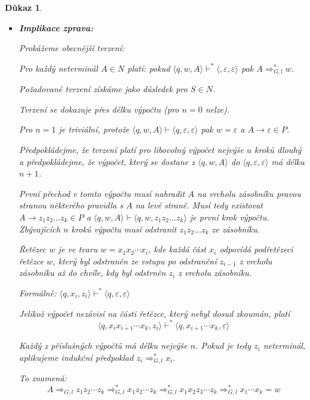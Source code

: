\documentclass[10pt, a4paper, titlepage]{article}
\theoremstyle{note}
\newtheorem{dukaz}{Důkaz}
\begin{document}
\begin{dukaz}
\begin{itemize}
Zřejmě $w=y_{i+1}u_{i+1}$ kde $x_{i+1}=y_iw_iv_i=y_{i+1}z_{i+1}$.

Ve speciálním případě: $i=n$ dostáváme $\langle q,w,S \rangle \vdash^* \langle q,u_n,z_n \rangle$, kde $w=y_nu_n$, $X_n=y_nz_n=w$ tj. dle 1. vlastnosti, protože $z_n$ je celý z terminálnch symbolů, platí, že $z_n=\varepsilon$, to jest $x_n=y_nz_n=y_n=w$ ale $w=y_nu_n$, odtud $u_n=\varepsilon$.

Takže $\langle q,w,S \rangle \vdash^* \langle q,\varepsilon,\varepsilon \rangle$.

\item
\textbf{Implikace zprava:}

Prokážeme obecnější tvrzení:

Pro každý neterminál $A \in N$ platí: pokud $\langle q,w,A \rangle \vdash^* \langle,\varepsilon,\varepsilon \rangle$ pak $A \Rightarrow_{G,l}^* w$.

Požadované tvrzení získáme jako důsledek pro $S \in N$.

Tvrzení se dokazuje přes délku výpočtu (pro $n=0$ nelze).

Pro $n=1$ je triviální, protože $\langle q,w,A \rangle \vdash \langle q,\varepsilon,\varepsilon \rangle$ pak $w=\varepsilon$ a $A \rightarrow \varepsilon \in P$.

Předpokládejme, že tvrzení platí pro libovolný výpočet nejvýše $u$ kroků dlouhý a předpokládejme, že výpočet, který se dostane z $\langle q,w,A \rangle$ do $\langle q,\varepsilon,\varepsilon \rangle$ má délku $n+1$.

První přechod v tomto výpočtu musí nahradit $A$ na vrcholu zásobníku pravou stranou některého pravidla s $A$ na levé straně. Musí tedy existovat $A \rightarrow z_1z_2\ldots z_k \in P$ a $\langle q,w,A \rangle \vdash \langle q,w,z_1z_2\ldots z_k \rangle$ je první krok výpočtu. Zbývajících $n$ kroků výpočtu musí odstranit $z_1z_2\ldots z_k$ ze zásobníku.%

Řetězec $w$ je ve tvaru $w=x_1x_2\cdots x_i$, kde každá část $x_i$ odpovídá podřetězeci řetězce $w$, který byl odstraněn ze vstupu po odstranění $z_{i-1}$ z vrcholu zásobníku až do chvíle, kdy byl odstrněn $z_i$ z vrcholu zásobníku.

Formálně: $\langle q,x_i,z_i \rangle \vdash^* \langle q,\varepsilon,\varepsilon \rangle$

Jelikož výpočet nezávisí na části řetězce, který nebyl dosud zkoumán, platí
$$\langle q,x_ix_{i+1}\cdots x_k,z_i \rangle \vdash^* \langle q,x_{i+1}\cdots x_k,\varepsilon \rangle$$

Každý z příslušných výpočtů má délku nejvýše $n$. Pokud je tedy $z_i$ neterminál, aplikujeme indukční předpoklad $z_i \Rightarrow_{G,l}^* x_i$.

To znamená:
$$
A \Rightarrow_{G,l} z_1z_2\cdots z_k \Rightarrow_{G,l}^* x_1z_2\cdots z_k \Rightarrow_{G,l}^* x_1x_2z_3\cdots z_k \Rightarrow_{G,l}^* x_1 \cdots x_k = w
$$
\end{itemize}
\end{dukaz}
\end{document}

